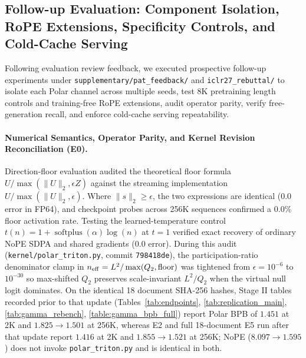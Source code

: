 \subsection{Follow-up Evaluation: Component Isolation, RoPE Extensions, Specificity Controls, and Cold-Cache Serving}
\label{appendix:pat_feedback}
\begin{revblock}

Following evaluation review feedback, we executed prospective follow-up experiments under \texttt{supplementary/pat\_feedback/} and \texttt{iclr27\_rebuttal/} to isolate each Polar channel across multiple seeds, test 8K pretraining length controls and training-free RoPE extensions, audit operator parity, verify free-generation recall, and enforce cold-cache serving repeatability.

\paragraph{Numerical Semantics, Operator Parity, and Kernel Revision Reconciliation (E0).}
Direction-floor evaluation audited the theoretical floor formula $U / \max(\|U\|_2, \epsilon Z)$ against the streaming implementation $U / \max(\|U\|_2, \epsilon)$. Where $\|s\|_2 \ge \epsilon$, the two expressions are identical ($0.0$ error in FP64), and checkpoint probes across 256K sequences confirmed a $0.0\%$ floor activation rate. Testing the learned-temperature control $t(n) = 1 + \operatorname{softplus}(\alpha) \log(n)$ at $t=1$ verified exact recovery of ordinary NoPE SDPA and shared gradients ($0.0$ error). During this audit (\texttt{kernel/polar\_triton.py}, commit \texttt{798418de}), the participation-ratio denominator clamp in $n_{\rm eff}=L^2/\max(Q_2,\text{floor})$ was tightened from $\epsilon=10^{-6}$ to $10^{-30}$ so max-shifted $Q_2$ preserves scale-invariant $L^2/Q_2$ when the virtual null logit dominates. On the identical 18 document SHA-256 hashes, Stage II tables recorded prior to that update (Tables~\ref{tab:endpoints}, \ref{tab:replication_main}, \ref{tab:gamma_rebench}, \ref{table:gamma_bpb_full}) report Polar BPB of $1.451$ at 2K and $1.825\rightarrow1.501$ at 256K, whereas E2 and full 18-document E5 run after that update report $1.416$ at 2K and $1.855\rightarrow1.521$ at 256K; NoPE ($8.097\rightarrow1.595$) does not invoke \texttt{polar\_triton.py} and is identical in both.


\end{revblock}
